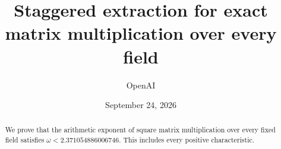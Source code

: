 \documentclass[11pt]{article}
\title{Staggered extraction for exact matrix multiplication over every field}
\author{OpenAI}
\date{September 24, 2026}
\theoremstyle{definition}
\theoremstyle{remark}
\newcommand{\1}{\mathbf{1}}
\begin{document}
\maketitle
\begin{abstract}
We prove that the arithmetic exponent of square matrix multiplication over
every fixed field satisfies $\omega<2.371054886006746$. This includes every
positive characteristic.
\end{abstract}







\clearpage
\appendix

\clearpage


\end{document}
